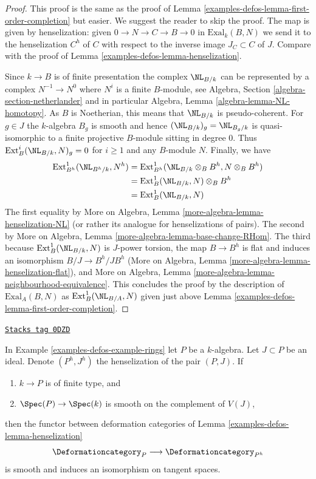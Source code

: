 \begin{proof}
This proof is the same as the proof of
Lemma \ref{examples-defos-lemma-first-order-completion} but easier. We suggest the
reader to skip the proof.
The map is given by henselization: given $0 \to N \to C \to B \to 0$
in $\text{Exal}_k(B, N)$ we send it to the
henselization $C^h$
of $C$ with respect to the inverse image $J_C \subset C$ of $J$.
Compare with the proof of Lemma \ref{examples-defos-lemma-henselization}.

\medskip\noindent
Since $k \to B$ is of finite presentation the complex
$\NL_{B/k}$ can be represented by a complex
$N^{-1} \to N^0$ where $N^i$ is a finite $B$-module, see
Algebra, Section \ref{algebra-section-netherlander} and
in particular
Algebra, Lemma \ref{algebra-lemma-NL-homotopy}.
As $B$ is Noetherian, this means that $\NL_{B/k}$
is pseudo-coherent. For $g \in J$ the $k$-algebra $B_g$
is smooth and hence $(\NL_{B/k})_g = \NL_{B_g/k}$
is quasi-isomorphic to a finite projective $B$-module sitting in degree $0$.
Thus $\text{Ext}^i_B(\NL_{B/k}, N)_g = 0$ for $i \geq 1$
and any $B$-module $N$. Finally, we have
\begin{align*}
\text{Ext}^1_{B^h}(\NL_{B^h/k}, N^h)
& =
\text{Ext}^1_{B^h}(\NL_{B/k} \otimes_B B^h, N \otimes_B B^h) \\
& =
\text{Ext}^1_B(\NL_{B/k}, N) \otimes_B B^h \\
& =
\text{Ext}^1_B(\NL_{B/k}, N)
\end{align*}
The first equality by
More on Algebra, Lemma \ref{more-algebra-lemma-henselization-NL}
(or rather its analogue for henselizations of pairs).
The second by
More on Algebra, Lemma \ref{more-algebra-lemma-base-change-RHom}.
The third because $\text{Ext}^1_B(\NL_{B/k}, N)$ is $J$-power
torsion, the map $B \to B^h$ is flat and induces an isomorphism
$B/J \to B^h/JB^h$ (More on Algebra, Lemma
\ref{more-algebra-lemma-henselization-flat}), and
More on Algebra, Lemma \ref{more-algebra-lemma-neighbourhood-equivalence}.
This concludes the proof by the description of $\text{Exal}_A(B, N)$
as $\text{Ext}^1_B(\NL_{B/A}, N)$ given just above
Lemma \ref{examples-defos-lemma-first-order-completion}.
\end{proof}

\begin{lemma}
\label{examples-defos-lemma-smooth-henselization}
\href{https://stacks.math.columbia.edu/tag/0DZD}{\texttt{Stacks tag 0DZD}}

In Example \ref{examples-defos-example-rings} let $P$ be a $k$-algebra.
Let $J \subset P$ be an ideal.
Denote $(P^h, J^h)$ the henselization of the pair $(P, J)$. If
\begin{enumerate}
\item $k \to P$ is of finite type, and
\item $\Spec(P) \to \Spec(k)$ is smooth on the complement of $V(J)$,
\end{enumerate}
then the functor between deformation categories of
Lemma \ref{examples-defos-lemma-henselization}
$$
\Deformationcategory_P \longrightarrow \Deformationcategory_{P^h}
$$
is smooth and induces an isomorphism on tangent spaces.
\end{lemma}

